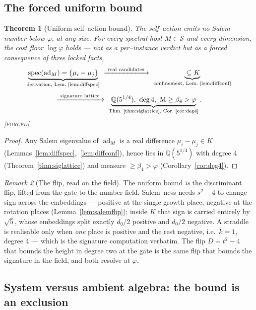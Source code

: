 \documentclass[11pt]{article}
\theoremstyle{plain}
\newtheorem{theorem}{Theorem}[section]
\theoremstyle{definition}
\theoremstyle{remark}
\newtheorem{remark}[theorem]{Remark}
\newcommand{\forced}{\textcolor{forcedc}{\textsc{[forced]}}}
\newcommand{\Q}{\mathbb{Q}}
\newcommand{\Mah}{\mathrm{M}}
\newcommand{\Scal}{\mathcal{S}}
\begin{document}
\subsection{The forced uniform bound}\label{sec:forcedbound}

\begin{theorem}[Uniform self--action bound]\label{thm:uniform}
The self--action emits no Salem number below $\varphi$, at any size. For every spectral host $M\in\Scal$ and every dimension, the cost floor $\log\varphi$ holds --- not as a per--instance verdict but as a forced consequence of three locked facts,
\[
\begin{gathered}
\underbrace{\operatorname{spec}(\operatorname{ad}_M)=\{\mu_i-\mu_j\}}_{\text{derivation, Lem.~\ref{lem:diffspec}}}
\ \xrightarrow{\ \text{real candidates}\ }\
\underbrace{{}\subseteq K}_{\text{confinement, Lem.~\ref{lem:diffconf}}}\\[4pt]
\xrightarrow{\ \text{signature lattice}\ }\
\underbrace{\Q(5^{1/4}),\ \deg 4,\ \Mah\ge\beta_4>\varphi}_{\text{Thm.~\ref{thm:siglattice}, Cor.~\ref{cor:deg4}}}.
\end{gathered}
\]
\forced
\end{theorem}

\begin{proof}
Any Salem eigenvalue of $\operatorname{ad}_M$ is a real difference $\mu_i-\mu_j\in K$ (Lemmas~\ref{lem:diffspec},~\ref{lem:diffconf}), hence lies in $\Q(5^{1/4})$ with degree $4$ (Theorem~\ref{thm:siglattice}) and measure $\ge\beta_4>\varphi$ (Corollary~\ref{cor:deg4}). \end{proof}

\begin{remark}[The flip, read on the field]\label{rem:fieldflip}
The uniform bound \emph{is} the discriminant flip, lifted from the gate to the number field. Salem--ness needs $s^2-4$ to change sign across the embeddings --- positive at the single growth place, negative at the rotation places (Lemma~\ref{lem:salemflip}); inside $K$ that sign is carried entirely by $\sqrt5$, whose embeddings split exactly $d_0/2$ positive and $d_0/2$ negative. A straddle is realisable only when \emph{one} place is positive and the rest negative, i.e.\ $k=1$, degree $4$ --- which is the signature computation verbatim. The flip $D=t^2-4$ that bounds the height in degree two at the gate is the same flip that bounds the signature in the field, and both resolve at $\varphi$.
\end{remark}

\subsection{System versus ambient algebra: the bound is an exclusion}\label{sec:exclusion}
\end{document}
